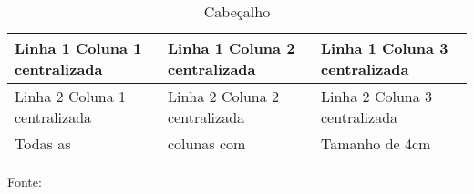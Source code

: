 \documentclass{article}
\begin{document}
	\begin{table}[h]
		\caption{Cabeçalho}	
		\begin{tabular}{|>{\centering\arraybackslash}m{4cm}|>{\centering\arraybackslash}m{4cm}|>{\centering\arraybackslash}m{4cm}|}
			\hline
			Linha 1 Coluna 1 centralizada & Linha 1 Coluna 2 centralizada & Linha 1 Coluna 3 centralizada \\
			\hline
			Linha 2 Coluna 1 centralizada & Linha 2 Coluna 2 centralizada & Linha 2 Coluna 3 centralizada \\
			\hline
			Todas as & colunas com & Tamanho de 4cm \\
			\hline
		\end{tabular}
		Fonte: 
		\label{key}
	\end{table}
\end{document}
